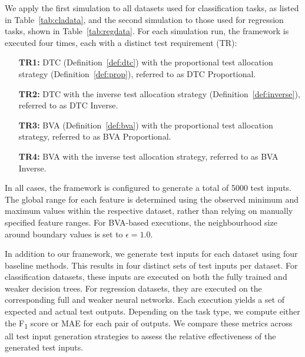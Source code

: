 \documentclass[
]{ceurart}
\theoremstyle{definition}
\begin{document}
We apply the first simulation to all datasets used for classification tasks, as listed in Table~\ref{tab:cladata}, and the second simulation to those used for regression tasks, shown in Table~\ref{tab:regdata}. For each simulation run, the framework is executed four times, each with a distinct test requirement (TR):
\begin{enumerate}[align=left]
\item[\textbf{TR1:}] DTC (Definition~\ref{def:dtc}) with the proportional test allocation strategy (Definition~\ref{def:prop}), referred to as DTC Proportional.
\item[\textbf{TR2:}] DTC with the inverse test allocation strategy (Definition~\ref{def:inverse}), referred to as DTC Inverse.
\item[\textbf{TR3:}] BVA (Definition~\ref{def:bva}) with the proportional test allocation strategy, referred to as BVA Proportional.
\item[\textbf{TR4:}] BVA with the inverse test allocation strategy, referred to as BVA Inverse.
\end{enumerate}

In all cases, the framework is configured to generate a total of 5000 test inputs. The global range for each feature is determined using the observed minimum and maximum values within the respective dataset, rather than relying on manually specified feature ranges. For BVA-based executions, the neighbourhood size around boundary values is set to $\epsilon = 1.0$.

In addition to our framework, we generate test inputs for each dataset using four baseline methods. This results in four distinct sets of test inputs per dataset. For classification datasets, these inputs are executed on both the fully trained and weaker decision trees. For regression datasets, they are executed on the corresponding full and weaker neural networks. Each execution yields a set of expected and actual test outputs. Depending on the task type, we compute either the F\textsubscript{1} score or MAE for each pair of outputs. We compare these metrics across all test input generation strategies to assess the relative effectiveness of the generated test inputs.

\end{document}
